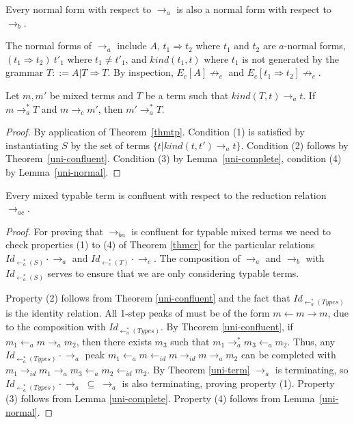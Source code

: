 \documentclass{LMCS}
\newcommand{\subse}{\; \subseteq \;}
\newcommand{\To}[0]{\Rightarrow}
\begin{document}
\begin{lem}
  \label{uni-normal}
  Every normal form with respect to $\to_a$ is also a normal form with respect to $\to_b$.
\end{lem}

The normal forms of $\to_a$ include $A$, $t_1 \To t_2$ where $t_1$
and $t_2$ are $a$-normal forms, $(t_1 \To t_2)\ t'_1$ where $t_1 \not= t'_1$, and
$kind(t_1,t)$ where $t_1$ is not generated by the grammar $T ::= A | T
\To T$. By inspection, $E_c[A] \not\to_c$ and $E_c[t_1 \To t_2] \not\to_c$.

\begin{thm}
\label{thm:presuni}
Let $m,m'$ be mixed terms and $T$ be a term such that $kind(T,t) \to_a t$. 
If $m \to_a^* T$ and $m\to_c m'$, then $m'\to_a^* T$.


\begin{proof}
  By application of Theorem~\ref{thmtp}. Condition (1) is satisfied by
  instantiating $S$ by the set  of terms $\{ t | kind(t,t') \to_a
  t\}$. Condition (2) follows by
  Theorem~\ref{uni-confluent}. Condition (3) by
  Lemma~\ref{uni-complete}, condition (4) by Lemma~\ref{uni-normal}.
\end{proof}
\end{thm}


\begin{thm}
  \label{uni-combined-confluent}
  Every mixed typable term is confluent with respect to the reduction
  relation $\to_{ac}$.

  \begin{proof}
For proving that $\to_{ba}$ is confluent for typable mixed terms we 
need to check properties (1) to (4) of Theorem \ref{thmcr} for the 
particular relations $\textit{Id}_{\leftarrow_a^*(S)} \cdot \to_a$
and $\textit{Id}_{\leftarrow_c^*(T)} \cdot \to_c$. The composition
of $\to_a$ and $\to_b$ with $\textit{Id}_{\leftarrow_a^*(S)}$ serves
to ensure that we are only considering typable terms.

Property (2) follows from Theorem \ref{uni-confluent} and the fact that
$\textit{Id}_{\leftarrow_a^*(\textit{Types})}$ is the identity relation. All 1-step
peaks of must be of the form $m \leftarrow m \to m$, due to the
composition with $\textit{Id}_{\leftarrow_a^*(\textit{Types})}$. By Theorem
\ref{uni-confluent}, if $m_1 \leftarrow_a m \to_a m_2$, then there exists
$m_3$ such that $m_1 \to_a^* m_3 \leftarrow_a m_2$. Thus, any
$\textit{Id}_{\leftarrow_a^*(\textit{Types})} \cdot \to_a$ peak $m_1 \leftarrow_a m
\leftarrow_{id} m \to_{id} m \to_a m_2$ can be completed with $m_1
\to_{id} m_1 \to_a m_3 \leftarrow_a m_2 \leftarrow_{id}
m_2$. By Theorem \ref{uni-term} $\to_a$ is terminating,
so $\textit{Id}_{\leftarrow_a^*(\textit{Types})} \cdot \to_a \subse \to_a$ is also
terminating, proving property (1). Property (3) follows from Lemma
\ref{uni-complete}. Property (4) follows from Lemma~\ref{uni-normal}.
  \end{proof}
  
\end{thm}
\end{document}
